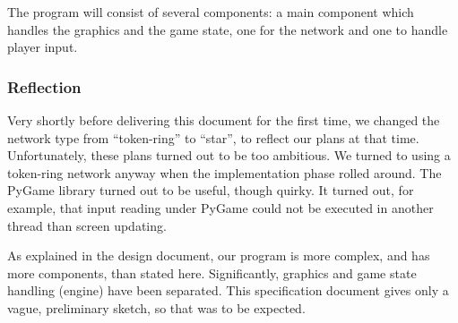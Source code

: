 The program will consist of several components: a main component which handles the graphics and the game state, one for the network and one to handle player input.

\subsubsection{Reflection}
Very shortly before delivering this document for the first time, we changed the network type from ``token-ring'' to ``star'', to reflect our plans at that time. Unfortunately, these plans turned out to be too ambitious. We turned to using a token-ring network anyway when the implementation phase rolled around. The PyGame library turned out to be useful, though quirky. It turned out, for example, that input reading under PyGame could not be executed in another thread than screen updating.

As explained in the design document, our program is more complex, and has more components, than stated here. Significantly, graphics and game state handling (engine) have been separated. This specification document gives only a vague, preliminary sketch, so that was to be expected.

